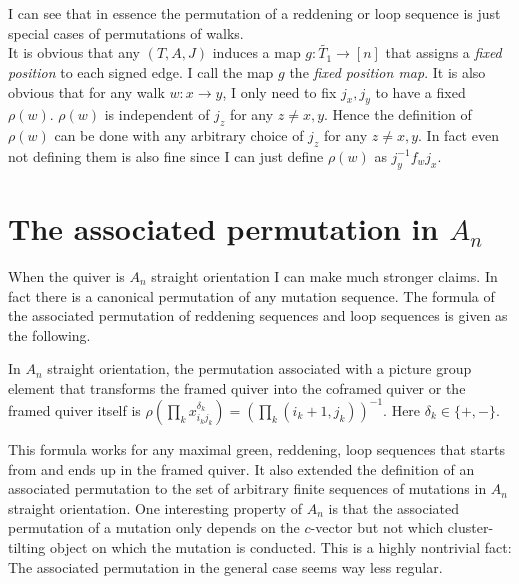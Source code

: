 \indent I can see that in essence the permutation of a reddening or loop sequence is just special cases of permutations of walks.\\
\indent It is obvious that any $(T,A,J)$ induces a map $g:\tilde{T_1}\to [n]$ that assigns a \textit{fixed position} to each signed edge. I call the map $g$ the \textit{fixed position map}. It is also obvious that for any walk $w: x\rightarrow y$, I only need to fix $j_x, j_y$ to have a fixed $\rho(w)$. $\rho(w)$ is independent of $j_z$ for any $z\neq x, y$. Hence the definition of $\rho(w)$ can be done with any arbitrary choice of $j_z$ for any $z\neq x,y$. In fact even not defining them is also fine since I can just define $\rho(w)$ as $j_y^{-1}f_wj_x$.\\
\section{The associated permutation in $A_n$}
\indent When the quiver is $A_n$ straight orientation I can make much stronger claims. In fact there is a canonical permutation of any mutation sequence. The formula of the associated permutation of reddening sequences and loop sequences is given as the following.\\
\begin{theorem}
In $A_n$ straight orientation, the permutation associated with a picture group element that transforms the framed quiver into the coframed quiver or the framed quiver itself is $\rho(\prod_{k}x_{i_kj_k}^{\delta_k}) = (\prod_{k}(i_k+1,j_k))^{-1}$. Here $\delta_k\in\{+,-\}$.\\
\end{theorem}
\indent This formula works for any maximal green, reddening, loop sequences that starts from and ends up in the framed quiver. It also extended the definition of an associated permutation to the set of arbitrary finite sequences of mutations in $A_n$ straight orientation. One interesting property of $A_n$ is that the associated permutation of a mutation only depends on the $c$-vector but not which cluster-tilting object on which the mutation is conducted. This is a highly nontrivial fact: The associated permutation in the general case seems way less regular.\\
